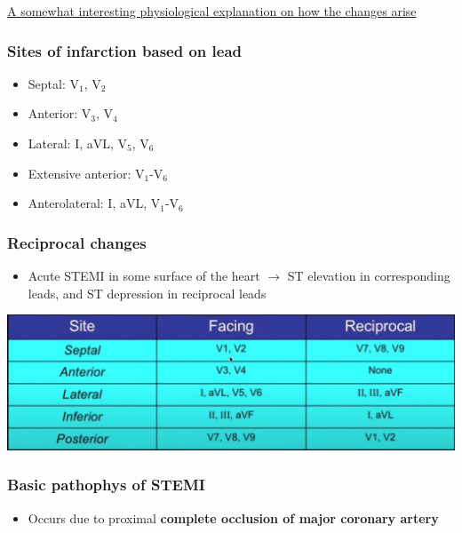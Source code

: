 \documentclass[
  12pt,
]{memoir}
\providecommand{\tightlist}{%
  \setlength{\itemsep}{0pt}\setlength{\parskip}{0pt}}
\begin{document}
\href{https://www.cvphysiology.com/CAD/CAD012}{A somewhat interesting
physiological explanation on how the changes arise}

\hypertarget{sites-of-infarction-based-on-lead}{%
\subsubsection{Sites of infarction based on
lead}\label{sites-of-infarction-based-on-lead}}

\begin{itemize}
\tightlist
\item
  Septal: V\(_1\), V\(_2\)
\item
  Anterior: V\(_3\), V\(_4\)
\item
  Lateral: I, aVL, V\(_5\), V\(_6\)
\item
  Extensive anterior: V\(_1\)-V\(_6\)
\item
  Anterolateral: I, aVL, V\(_1\)-V\(_6\)
\end{itemize}

\hypertarget{reciprocal-changes}{%
\subsubsection{Reciprocal changes}\label{reciprocal-changes}}

\begin{itemize}
\tightlist
\item
  Acute STEMI in some surface of the heart \(\rightarrow\) ST elevation
  in corresponding leads, and ST depression in reciprocal leads
\end{itemize}

\includegraphics[width=.7\textwidth]{../assets/med/reciprocal-leads.jpg}

\hypertarget{basic-pathophys-of-stemi}{%
\subsubsection{Basic pathophys of
STEMI}\label{basic-pathophys-of-stemi}}

\begin{itemize}
\tightlist
\item
  Occurs due to proximal \textbf{complete occlusion of major coronary
  artery}
\end{itemize}
\end{document}
